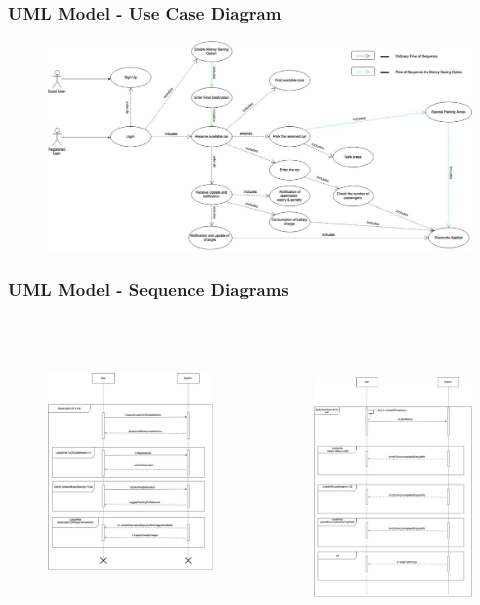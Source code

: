 \begin{frame}
	\frametitle{UML Model - Use Case Diagram}
	\begin{figure}[H]
		\centering
		\includegraphics[width=\linewidth,keepaspectratio]{figures/use_case_diagram.eps}
		\label{fig:use_case_diagram}
	\end{figure}
\end{frame}

\begin{frame}
	\frametitle{UML Model - Sequence Diagrams}
	\begin{columns}[c]
		\begin{figure}[H]
			\centering
			\includegraphics[height=6.7cm,keepaspectratio]{figures/sequence_reservation.eps}
			\label{fig:sequence_reservation}
		\end{figure}
		\begin{figure}[H]
			\centering
			\includegraphics[height=7.5cm,keepaspectratio]{figures/sequence_discounts.eps}
			\label{fig:sequence_discounts}
		\end{figure}
	\end{columns}
\end{frame}

